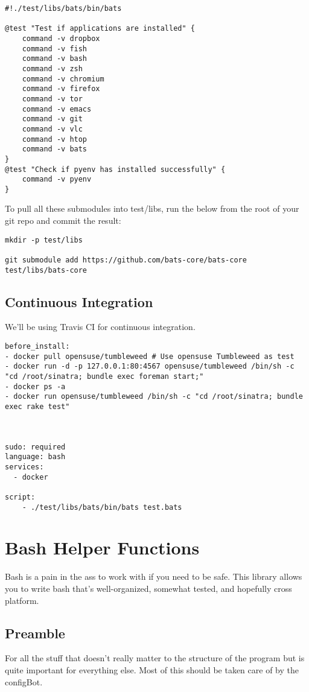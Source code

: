 \documentclass[11pt]{article}
\begin{document}
\begin{verbatim}
#!./test/libs/bats/bin/bats

@test "Test if applications are installed" {
    command -v dropbox
    command -v fish
    command -v bash
    command -v zsh
    command -v chromium
    command -v firefox
    command -v tor
    command -v emacs
    command -v git
    command -v vlc
    command -v htop
    command -v bats
}
@test "Check if pyenv has installed successfully" {
    command -v pyenv
}
\end{verbatim}

To pull all these submodules into test/libs, run the below from the root of your git repo and commit the result:
\begin{verbatim}
mkdir -p test/libs

git submodule add https://github.com/bats-core/bats-core test/libs/bats-core
\end{verbatim}

\subsection{Continuous Integration}
\label{sec:orgae6c26e}
We'll be using Travis CI for continuous integration.

\begin{verbatim}
before_install: 
- docker pull opensuse/tumbleweed # Use opensuse Tumbleweed as test
- docker run -d -p 127.0.0.1:80:4567 opensuse/tumbleweed /bin/sh -c "cd /root/sinatra; bundle exec foreman start;"
- docker ps -a
- docker run opensuse/tumbleweed /bin/sh -c "cd /root/sinatra; bundle exec rake test"



sudo: required
language: bash
services:
  - docker

script:
    - ./test/libs/bats/bin/bats test.bats
\end{verbatim}


\section{Bash Helper Functions}
\label{sec:org66673a6}
Bash is a pain in the ass to work with if you need to be safe. This library allows you to write bash that's well-organized, somewhat tested, and hopefully cross platform.

\subsection{Preamble}
\label{sec:orgeb49d1c}
For all the stuff that doesn't really matter to the structure of the program but is quite important for everything else.
Most of this should be taken care of by the configBot.
\end{document}
